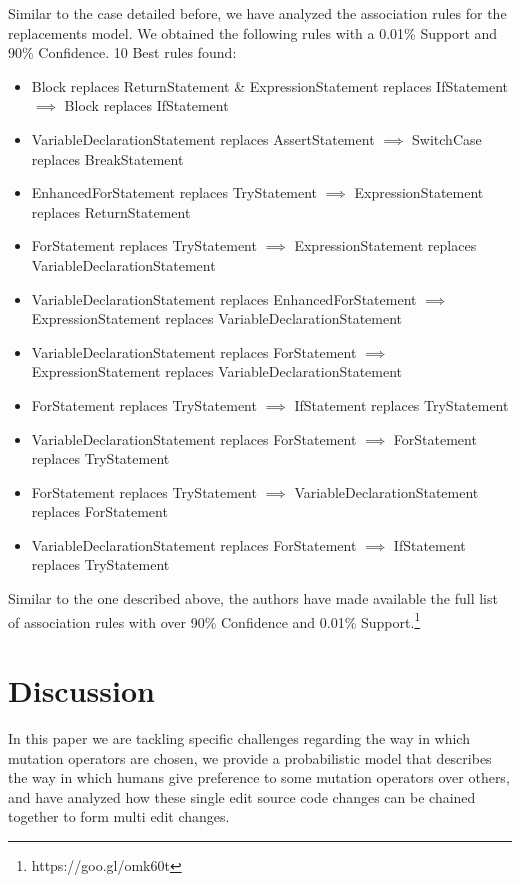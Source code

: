 \documentclass[conference]{IEEEtran}
\begin{document}
{Similar to the case detailed before, we have analyzed the association rules for the replacements model. We obtained the following rules with a 0.01\% Support and 90\% Confidence.
10 Best rules found:
\begin{itemize}
\item Block replaces ReturnStatement \& ExpressionStatement replaces IfStatement $\implies$ Block replaces IfStatement
\item VariableDeclarationStatement replaces AssertStatement $\implies$ SwitchCase replaces BreakStatement
\item EnhancedForStatement replaces TryStatement $\implies$ ExpressionStatement replaces ReturnStatement
\item ForStatement replaces TryStatement $\implies$ ExpressionStatement replaces VariableDeclarationStatement
\item VariableDeclarationStatement replaces EnhancedForStatement $\implies$ ExpressionStatement replaces VariableDeclarationStatement
\item VariableDeclarationStatement replaces ForStatement $\implies$ ExpressionStatement replaces VariableDeclarationStatement
\item ForStatement replaces TryStatement $\implies$ IfStatement replaces TryStatement
\item VariableDeclarationStatement replaces ForStatement $\implies$ ForStatement replaces TryStatement
\item ForStatement replaces TryStatement $\implies$ VariableDeclarationStatement replaces ForStatement
\item VariableDeclarationStatement replaces ForStatement $\implies$ IfStatement replaces TryStatement
\end{itemize}

Similar to the one described above, the authors have made available the full list of association rules with over 90\% Confidence and 0.01\% Support.\footnote{https://goo.gl/omk60t}

\section{Discussion} \label{discussion}
In this paper we are tackling specific 
challenges regarding the way in which mutation operators are chosen, we provide 
a probabilistic model that describes the way in which humans give preference to 
some mutation operators over others, and have analyzed how these single edit 
source code changes can be chained together to form multi edit changes.

}
\end{document}
